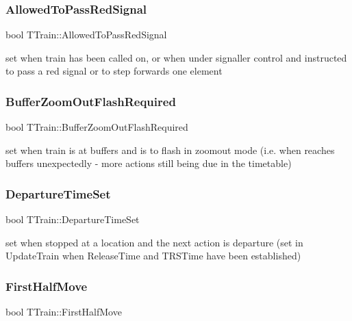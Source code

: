 \subsubsection{\texorpdfstring{Allowed\+To\+Pass\+Red\+Signal}{AllowedToPassRedSignal}}
{\footnotesize\ttfamily bool T\+Train\+::\+Allowed\+To\+Pass\+Red\+Signal\hspace{0.3cm}{\ttfamily [private]}}

set when train has been called on, or when under signaller control and instructed to pass a red signal or to step forwards one element \mbox{\label{class_t_train_a60a3a9bebf64411f5d200682575a69ee}} 
\subsubsection{\texorpdfstring{Buffer\+Zoom\+Out\+Flash\+Required}{BufferZoomOutFlashRequired}}
{\footnotesize\ttfamily bool T\+Train\+::\+Buffer\+Zoom\+Out\+Flash\+Required\hspace{0.3cm}{\ttfamily [private]}}

set when train is at buffers and is to flash in zoomout mode (i.\+e. when reaches buffers unexpectedly -\/ more actions still being due in the timetable) \mbox{\label{class_t_train_ab4f3876cb58a6160c2f1cd7a7eb3f234}} 
\subsubsection{\texorpdfstring{Departure\+Time\+Set}{DepartureTimeSet}}
{\footnotesize\ttfamily bool T\+Train\+::\+Departure\+Time\+Set\hspace{0.3cm}{\ttfamily [private]}}

set when stopped at a location and the next action is departure (set in Update\+Train when Release\+Time and T\+R\+S\+Time have been established) \mbox{\label{class_t_train_a638de0cfb04b13fb28edd5e61d2d628f}} 
\subsubsection{\texorpdfstring{First\+Half\+Move}{FirstHalfMove}}
{\footnotesize\ttfamily bool T\+Train\+::\+First\+Half\+Move\hspace{0.3cm}{\ttfamily [private]}}

